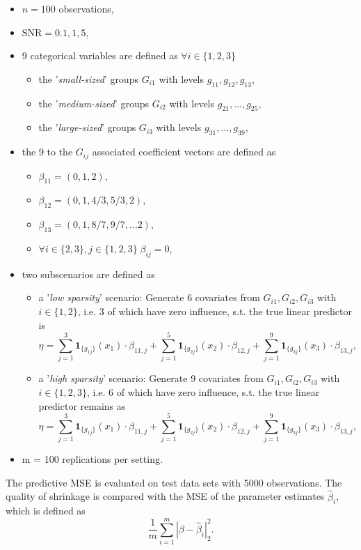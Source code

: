 \documentclass[12pt,letterpaper]{article}
\numberwithin{equation}{subsection}
\begin{document}
\begin{itemize}
\item $n = 100$ observations,
\item $\text{SNR} = 0.1, 1, 5$,
\item 9 categorical variables are defined as $\forall i \in \{1,2,3\}$
\begin{itemize}
\item the '\textit{small-sized}' groups $G_{i1}$ with levels $g_{11},g_{12},g_{13}$,
\item the '\textit{medium-sized}' groups $G_{i2}$ with levels $g_{21},\dots,g_{25}$,
\item the '\textit{large-sized}' groups $G_{i3}$ with levels $g_{31},\dots,g_{39}$,
\end{itemize}
\item the 9 to the $G_{ij}$ associated coefficient vectors are defined as
\begin{itemize}
\item $\beta_{11} = (0,1,2),$ 
\item $\beta_{12} = (0,1,4/3,5/3,2),$ 
\item $\beta_{13} = (0,1,8/7,9/7,\dots2),$ 
\item $\forall i \in \{2,3\}, j \in \{1,2,3\} \;\beta_{ij} = 0,$ 
\end{itemize}
\item two subscenarios are defined as
\begin{itemize}
\item a '\textit{low sparsity}' scenario: Generate 6 covariates from $G_{i1},G_{i2},G_{i3}$ with $i \in \{1,2\}$, i.e. 3 of which have zero influence, s.t. the true linear predictor is 
\begin{equation*}
\eta = \sum^3_{j=1}\mathbf{1}_{\{g_{1j}\}}(x_1) \cdot \beta_{11,j} +  \sum^5_{j=1}\mathbf{1}_{\{g_{2j}\}}(x_2) \cdot \beta_{12,j} +  
\sum^9_{j=1}\mathbf{1}_{\{g_{3j}\}}(x_3) \cdot \beta_{13,j},
\end{equation*}
\item a '\textit{high sparsity}' scenario: Generate 9 covariates from $G_{i1},G_{i2},G_{i3}$ with $i \in \{1,2,3\}$, i.e. 6 of which have zero influence, s.t. the true linear predictor remains as
\begin{equation*}
\eta = \sum^3_{j=1}\mathbf{1}_{\{g_{1j}\}}(x_1) \cdot \beta_{11,j} +  \sum^5_{j=1}\mathbf{1}_{\{g_{2j}\}}(x_2) \cdot \beta_{12,j} +  
\sum^9_{j=1}\mathbf{1}_{\{g_{3j}\}}(x_3) \cdot \beta_{13,j},
\end{equation*}
\end{itemize}
\item m = 100 replications per setting.
\end{itemize}
The predictive MSE is evaluated on test data sets with 5000 observations. The quality of shrinkage is compared with the MSE of the parameter estimates $\hat{\beta}_i$, which is defined as
\[
\frac{1}{m}\sum^m_{i=1}|\beta - \hat{\beta}_i|^2_2.
\]
\end{document}
